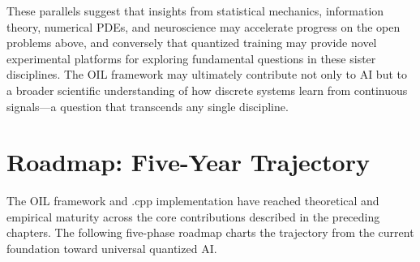 These parallels suggest that insights from statistical mechanics, information theory, numerical PDEs, and neuroscience may accelerate progress on the open problems above, and conversely that quantized training may provide novel experimental platforms for exploring fundamental questions in these sister disciplines. The OIL framework may ultimately contribute not only to AI but to a broader scientific understanding of how discrete systems learn from continuous signals---a question that transcends any single discipline.

\section{Roadmap: Five-Year Trajectory}
\label{sec:roadmap}

The OIL framework and \MYTHOS{}.cpp implementation have reached theoretical and empirical maturity across the core contributions described in the preceding chapters. The following five-phase roadmap charts the trajectory from the current foundation toward universal quantized AI.

